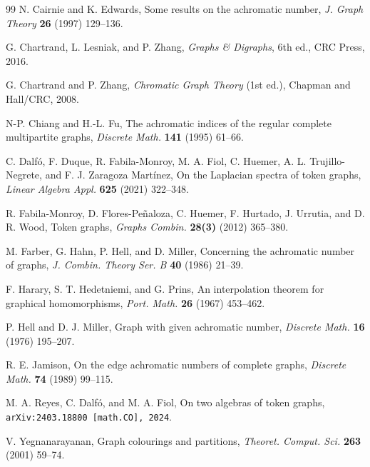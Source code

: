 \documentclass{article}
\begin{document}
\begin{thebibliography}{99}
N. Cairnie and K. Edwards,
Some results on the achromatic number,
\textit{J. Graph Theory} \textbf{26} (1997) 129--136.

G. Chartrand, L. Lesniak, and P. Zhang, \textit{Graphs \& Digraphs}, 6th ed., CRC Press, 2016.

G. Chartrand and P. Zhang, 
\textit{Chromatic Graph Theory} (1st ed.),
Chapman and Hall/CRC, 2008.


N-P. Chiang and H.-L. Fu,
The achromatic indices of the regular complete multipartite graphs,
{\em Discrete Math.} {\bf 141} (1995) 61--66.

C. Dalf\'o, F. Duque, R. Fabila-Monroy, M. A. Fiol, C. Huemer, A. L. Trujillo-Negrete, and F. J. Zaragoza Mart\'inez, 
On the Laplacian spectra of token graphs,
{\em Linear Algebra Appl.} {\bf 625} (2021) 322--348.

R. Fabila-Monroy, D. Flores-Pe\~{n}aloza, C. Huemer, F. Hurtado, J. Urrutia, and D. R. Wood,
Token graphs,
\emph{Graphs Combin.} \textbf{28(3)} (2012) 365--380.

M. Farber, G. Hahn, P. Hell, and D. Miller,
Concerning the achromatic number of graphs,
\textit{J. Combin. Theory Ser. B} \textbf{40} (1986) 21--39.


F. Harary, S. T. Hedetniemi, and G. Prins,
An interpolation theorem for graphical homomorphisms, \textit{Port. Math.} \textbf{26} (1967) 453--462.

P. Hell and D. J. Miller,
Graph with given achromatic number,
\textit{Discrete Math.} \textbf{16} (1976) 195--207.

R. E. Jamison,
On the edge achromatic numbers of complete graphs,
\textit{Discrete Math.} \textbf{74} (1989) 99--115.


M. A. Reyes, C. Dalfó, and M. A. Fiol,
On two algebras of token graphs,
\texttt{arXiv:2403.18800 [math.CO], 2024}.

V. Yegnanarayanan,
Graph colourings and partitions,
\textit{Theoret. Comput. Sci.} \textbf{263} (2001) 59--74.

\end{thebibliography}
\end{document}
